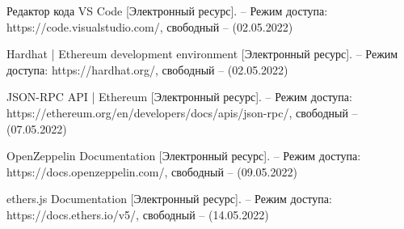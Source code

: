 \begin{thebibliography}{}
	Редактор кода VS Code [Электронный ресурс]. -- Режим доступа: https://code.visualstudio.com/, свободный -- (02.05.2022)
	
	Hardhat | Ethereum development environment [Электронный ресурс]. -- Режим доступа: https://hardhat.org/, свободный -- (02.05.2022)
	
	JSON-RPC API | Ethereum [Электронный ресурс]. -- Режим доступа: https://ethereum.org/en/developers/docs/apis/json-rpc/, свободный -- (07.05.2022)
	
	OpenZeppelin Documentation [Электронный ресурс]. -- Режим доступа: https://docs.openzeppelin.com/, свободный -- (09.05.2022)
	
	ethers.js Documentation [Электронный ресурс]. -- Режим доступа: https://docs.ethers.io/v5/, свободный -- (14.05.2022)

\end{thebibliography}
\endgroup

\pagebreak